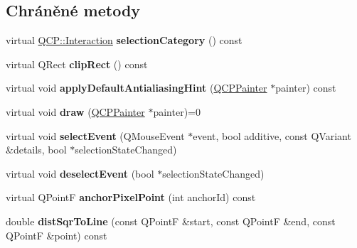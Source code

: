 \subsection*{Chráněné metody}
\begin{DoxyCompactItemize}
\item 
\hypertarget{classQCPAbstractItem_a777b5d384936396ad9c3ceb3d3453f1c}{}virtual \hyperlink{namespaceQCP_a2ad6bb6281c7c2d593d4277b44c2b037}{Q\+C\+P\+::\+Interaction} {\bfseries selection\+Category} () const \label{classQCPAbstractItem_a777b5d384936396ad9c3ceb3d3453f1c}

\item 
\hypertarget{classQCPAbstractItem_a538e25ff8856534582f5b2b400a46405}{}virtual Q\+Rect {\bfseries clip\+Rect} () const \label{classQCPAbstractItem_a538e25ff8856534582f5b2b400a46405}

\item 
\hypertarget{classQCPAbstractItem_a0839031abdd71067e2256a4d53c7a011}{}virtual void {\bfseries apply\+Default\+Antialiasing\+Hint} (\hyperlink{classQCPPainter}{Q\+C\+P\+Painter} $\ast$painter) const \label{classQCPAbstractItem_a0839031abdd71067e2256a4d53c7a011}

\item 
\hypertarget{classQCPAbstractItem_ad0dc056f650c3ca73414e6b4f01674ef}{}virtual void {\bfseries draw} (\hyperlink{classQCPPainter}{Q\+C\+P\+Painter} $\ast$painter)=0\label{classQCPAbstractItem_ad0dc056f650c3ca73414e6b4f01674ef}

\item 
\hypertarget{classQCPAbstractItem_aaf92af7b9893712959a6c073d334d88d}{}virtual void {\bfseries select\+Event} (Q\+Mouse\+Event $\ast$event, bool additive, const Q\+Variant \&details, bool $\ast$selection\+State\+Changed)\label{classQCPAbstractItem_aaf92af7b9893712959a6c073d334d88d}

\item 
\hypertarget{classQCPAbstractItem_a91f090d6763cfedb0749219c63788ae9}{}virtual void {\bfseries deselect\+Event} (bool $\ast$selection\+State\+Changed)\label{classQCPAbstractItem_a91f090d6763cfedb0749219c63788ae9}

\item 
\hypertarget{classQCPAbstractItem_a94bde62b8a2fc133666dcbb8035deeed}{}virtual Q\+Point\+F {\bfseries anchor\+Pixel\+Point} (int anchor\+Id) const \label{classQCPAbstractItem_a94bde62b8a2fc133666dcbb8035deeed}

\item 
\hypertarget{classQCPAbstractItem_acdca343717d625b8abb3c3e38c0ed39d}{}double {\bfseries dist\+Sqr\+To\+Line} (const Q\+Point\+F \&start, const Q\+Point\+F \&end, const Q\+Point\+F \&point) const \label{classQCPAbstractItem_acdca343717d625b8abb3c3e38c0ed39d}


\end{DoxyCompactItemize}
